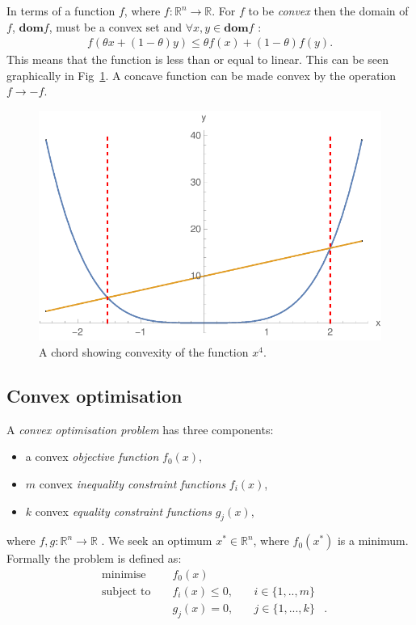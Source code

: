 \documentclass[twocolumn,secnumarabic,amssymb, nobibnotes, aps, prl,superscriptaddress]{revtex4-1}
\begin{document}
In terms of a function $f$, where $f:\mathbb{R}^n \rightarrow \mathbb{R}$. For $f$ to be \textit{convex} then the domain of $f$, $\textbf{dom} f$, must be a convex set and $\forall x,y\in \textbf{dom} f$ \cite[p.67]{cvxpybook}:
\begin{align}
f(\theta x + (1-\theta)y) \leq \theta f(x)+(1-\theta)f(y).
\end{align}
This means that the function is less than or equal to linear. This can be seen graphically in Fig~\ref{fig:convex}. A concave function can be made convex by the operation $f\to-f$.
\begin{figure}
\includegraphics[width=0.9\linewidth]{convex_function.pdf}
\caption{\label{fig:convex}A chord showing convexity of the function $x^4$.} 
\end{figure}

\subsection{Convex optimisation}
A \textit{convex optimisation problem} has three components:
\begin{itemize}
\item a convex \textit{objective function} $f_0(x)$,
\item $m$ convex \textit{inequality constraint functions} $f_i(x)$,
\item $k$ convex \textit{equality constraint functions} $g_j(x)$, 
\end{itemize}
where $f,g: \mathbb{R}^n \rightarrow \mathbb{R}$ \cite[p.141]{cvxpybook}. We seek an optimum $x^*\in \mathbb{R}^n$, where $f_0(x^*)$ is a minimum. Formally the problem is defined as:
\begin{align} \label{eq:cvxdefn}
&\text{minimise } && f_0(x) & \nonumber &\\
&\text{subject to } && f_i(x) \leq 0,\quad & i\in \{1,..,m\}\nonumber &\\
& && g_{j}(x)=0,\quad & j\in \{1,...,k\} &.
\end{align}
\end{document}
